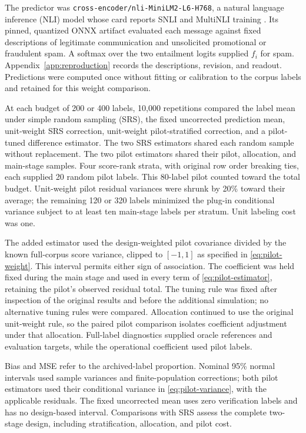 \documentclass[11pt,a4paper]{article}
\begin{document}
The predictor was \nolinkurl{cross-encoder/nli-MiniLM2-L6-H768}, a natural language inference (NLI) model whose card reports SNLI and MultiNLI training \citep{sms-model}. Its pinned, quantized ONNX artifact evaluated each message against fixed descriptions of legitimate communication and unsolicited promotional or fraudulent spam. A softmax over the two entailment logits supplied $f_i$ for spam. Appendix~\ref{app:reproduction} records the descriptions, revision, and readout. Predictions were computed once without fitting or calibration to the corpus labels and retained for this weight comparison.

At each budget of 200 or 400 labels, 10,000 repetitions compared the label mean under simple random sampling (SRS), the fixed uncorrected prediction mean, unit-weight SRS correction, unit-weight pilot-stratified correction, and a pilot-tuned difference estimator. The two SRS estimators shared each random sample without replacement. The two pilot estimators shared their pilot, allocation, and main-stage samples. Four score-rank strata, with original row order breaking ties, each supplied 20 random pilot labels. This 80-label pilot counted toward the total budget. Unit-weight pilot residual variances were shrunk by 20\% toward their average; the remaining 120 or 320 labels minimized the plug-in conditional variance subject to at least ten main-stage labels per stratum. Unit labeling cost was one.

The added estimator used the design-weighted pilot covariance divided by the known full-corpus score variance, clipped to $[-1,1]$ as specified in \eqref{eq:pilot-weight}. This interval permits either sign of association. The coefficient was held fixed during the main stage and used in every term of \eqref{eq:pilot-estimator}, retaining the pilot's observed residual total. The tuning rule was fixed after inspection of the original results and before the additional simulation; no alternative tuning rules were compared. Allocation continued to use the original unit-weight rule, so the paired pilot comparison isolates coefficient adjustment under that allocation. Full-label diagnostics supplied oracle references and evaluation targets, while the operational coefficient used pilot labels.

Bias and MSE refer to the archived-label proportion. Nominal 95\% normal intervals used sample variances and finite-population corrections; both pilot estimators used their conditional variance in \eqref{eq:pilot-variance}, with the applicable residuals. The fixed uncorrected mean uses zero verification labels and has no design-based interval. Comparisons with SRS assess the complete two-stage design, including stratification, allocation, and pilot cost.
\end{document}
